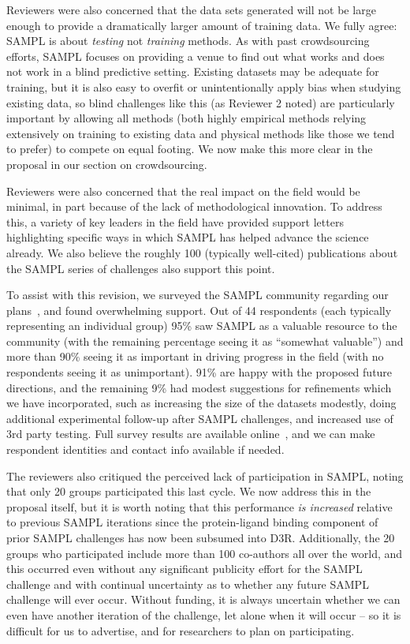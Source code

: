 \documentclass[11pt]{article}
\begin{document}
Reviewers were also concerned that the data sets generated will not be large enough to provide a dramatically larger amount of training data. 
We fully agree: SAMPL is about \emph{testing} not \emph{training} methods.
As with past crowdsourcing efforts, SAMPL focuses on providing a venue to find out what works and does not work in a blind predictive setting.
Existing datasets may be adequate for training, but it is also easy to overfit or unintentionally apply bias when studying existing data, so blind challenges like this (as Reviewer 2 noted) are particularly important by allowing all methods (both highly empirical methods relying extensively on training to existing data and physical methods like those we tend to prefer) to compete on equal footing.
We now make this more clear in the proposal in our section %
on crowdsourcing.

Reviewers were also concerned that the real impact on the field would be minimal, in part because of the lack of methodological innovation.
To address this, a variety of key leaders in the field have provided support letters highlighting specific ways in which SAMPL has helped advance the science already. 
We also believe the roughly 100 (typically well-cited) publications about the SAMPL series of challenges also support this point.

To assist with this revision, we surveyed the SAMPL community regarding our plans~\cite{Mobley:2017:eScholarship}, and found overwhelming support. 
Out of 44 respondents (each typically representing an individual group) 95\% saw SAMPL as a valuable resource to the community (with the remaining percentage seeing it as ``somewhat valuable'') and more than 90\% seeing it as important in driving progress in the field (with no respondents seeing it as unimportant). 91\% are happy with the proposed future directions, and the remaining 9\% had modest suggestions for refinements which we have incorporated, such as increasing the size of the datasets modestly, doing additional experimental follow-up after SAMPL challenges, and increased use of 3rd party testing. Full survey results are available online~\cite{Mobley:2017:eScholarship}, and we can make respondent identities and contact info available if needed.

The reviewers also critiqued the perceived lack of participation in SAMPL, noting that only 20 groups participated this last cycle. 
We now address this in the proposal itself, but it is worth noting that this performance \emph{is increased} relative to previous SAMPL iterations since the protein-ligand binding component of prior SAMPL challenges has now been subsumed into D3R. 
Additionally, the 20 groups who participated include more than 100 co-authors all over the world, and this occurred even without any significant publicity effort for the SAMPL challenge and with continual uncertainty as to whether any future SAMPL challenge will ever occur. 
Without funding, it is always uncertain whether we can even have another iteration of the challenge, let alone when it will occur -- so it is difficult for us to advertise, and for researchers to plan on participating. 
\end{document}

